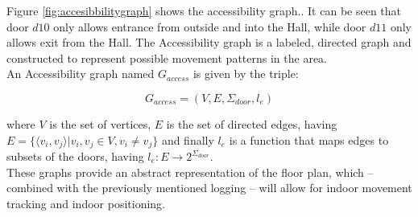 Figure \ref{fig:accesibbilitygraph} shows the accessibility graph..
It can be seen that door $d10$ only allows entrance from outside and into the Hall, while door $d11$ only allows exit from the Hall.
The Accessibility graph is a labeled, directed graph and constructed to represent possible movement patterns in the area. \\

An Accessibility graph named $G_{access}$ is given by the triple: 

\begin{equation}
G_{access} = (V, E, \Sigma_{door}, l_e)
\end{equation} 

where $V$ is the set of vertices, $E$ is the set of directed edges, having $E = \{\langle v_i, v_j \rangle | v_i, v_j \in V,  v_i \not= v_j\}$ and finally $l_e$ is a function that maps edges to subsets of the doors, having $l_e : E \rightarrow 2^{\Sigma_{door}}$. \\

These graphs provide an abstract representation of the floor plan, which -- combined with the previously mentioned logging -- will allow for indoor movement tracking and indoor positioning. 

